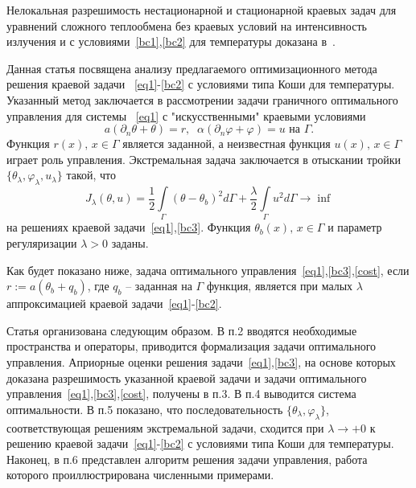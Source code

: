 Нелокальная разрешимость
нестационарной и стационарной краевых задач для уравнений сложного теплообмена
без краевых условий на интенсивность излучения и
с условиями~\eqref{bc1},\eqref{bc2} для температуры доказана в~\cite{CNSNS19,CMMP20}.

Данная статья посвящена анализу предлагаемого оптимизационного метода решения краевой задачи
~\eqref{eq1}-\eqref{bc2} с условиями типа Коши для температуры.
Указанный метод заключается в рассмотрении задачи граничного оптимального управления для
системы ~\eqref{eq1} с  "искусственными" краевыми условиями
\begin{equation}
    \label{bc3} a(\partial_n\theta+\theta) = r,\;\; \alpha(\partial_n\varphi+\varphi) = u \text{  на  }\Gamma.
\end{equation}
Функция $r(x),\, x\in\Gamma$ является заданной, а неизвестная функция $u(x),\, x\in\Gamma$
играет роль управления.
Экстремальная задача заключается в отыскании тройки $\{\theta_\lambda,\varphi_\lambda,u_\lambda\}$
такой, что
\begin{equation}
    \label{cost}
    J_\lambda(\theta, u) = \frac{1}{2}\int\limits_\Gamma (\theta - \theta_b)^2d\Gamma
    + \frac{\lambda}{2}\int\limits_\Gamma u^2d\Gamma \rightarrow\inf
\end{equation}
на решениях краевой задачи~\eqref{eq1},\eqref{bc3}.
Функция $\theta_b(x),\, x\in\Gamma$  и параметр регуляризации $\lambda>0$ заданы.

Как будет показано ниже, задача оптимального управления~\eqref{eq1},\eqref{bc3},\eqref{cost}, если
$r:=a(\theta_b+q_b)$, где $q_b$ -- заданная на $\Gamma$ функция,
является при малых $\lambda$ аппроксимацией краевой задачи~\eqref{eq1}-\eqref{bc2}.

Статья организована следующим образом.
В п.2 вводятся необходимые пространства и операторы, приводится
формализация задачи оптимального управления.
Априорные оценки решения задачи~\eqref{eq1},\eqref{bc3}, на основе которых
доказана разрешимость указанной краевой задачи и задачи оптимального управления~\eqref{eq1},\eqref{bc3},\eqref{cost}, получены в п.3.
В п.4 выводится система оптимальности. В п.5 показано, что
последовательность $\{\theta_\lambda,\varphi_\lambda\}$, соответствующая решениям
экстремальной задачи,
сходится при $\lambda\to +0$ к решению краевой задачи~\eqref{eq1}-\eqref{bc2} с условиями типа Коши для температуры.
Наконец, в п.6 представлен алгоритм решения задачи управления, работа которого проиллюстрирована численными примерами.

